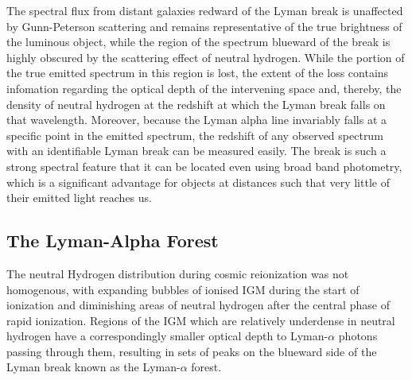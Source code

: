 		The spectral flux from distant galaxies redward of the Lyman break is unaffected by Gunn-Peterson scattering and remains representative of the true brightness of the luminous object, while the region of the spectrum blueward of the break is highly obscured by the scattering effect of neutral hydrogen. While the portion of the true emitted spectrum in this region is lost, the extent of the loss contains infomation regarding the optical depth of the intervening space and, thereby, the density of neutral hydrogen at the redshift at which the Lyman break falls on that wavelength. Moreover, because the Lyman alpha line invariably falls at a specific point in the emitted spectrum, the redshift of any observed spectrum with an identifiable Lyman break can be measured easily. The break is such a strong spectral feature that it can be located even using broad band photometry, which is a significant advantage for objects at distances such that very little of their emitted light reaches us.

	\subsection{The Lyman-Alpha Forest} %
	\label{sub:the_lyman_alpha_forest}
		The neutral Hydrogen distribution during cosmic reionization was not homogenous, with expanding bubbles of ionised IGM during the start of ionization and diminishing areas of neutral hydrogen after the central phase of rapid ionization. Regions of the IGM which are relatively underdense in neutral hydrogen have a correspondingly smaller optical depth to Lyman-$\alpha$ photons passing through them, resulting in sets of peaks on the blueward side of the Lyman break known as the Lyman-$\alpha$ forest.

